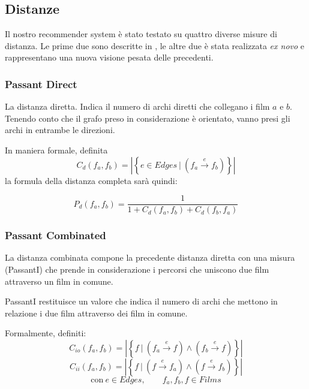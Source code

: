 \label{Measure}

\subsection{Distanze}

Il nostro recommender system è stato testato su quattro diverse misure di distanza.
Le prime due sono descritte in \citet{passant2010measuring}, le altre due è stata realizzata \emph{ex novo} e rappresentano una nuova visione pesata delle precedenti.


\subsubsection{Passant Direct}
\label{PassantD}
La distanza diretta. Indica il numero di archi diretti che collegano i film $a$ e $b$. Tenendo conto che il grafo preso in considerazione è orientato, vanno presi gli archi in entrambe le direzioni.

In maniera formale, definita $$C_{d}(f_a,f_b) = \left\vert \left\{ e \in Edges \  | \  (f_a \xrightarrow{~e~} f_b ) \right\} \right\vert$$ la formula della distanza completa sarà quindi:


    \begin{equation}
        P_{d}(f_{a},f_{b}) = \frac{1} {1+C_{d}(f_{a},f_{b})+C_{d}(f_{b},f_{a})}
    \end{equation}

\subsubsection{Passant Combinated}
\label{PassantC}

La distanza combinata compone la precedente distanza diretta con una misura
(PassantI) che prende in considerazione i percorsi che uniscono due film
attraverso un film in comune.

PassantI restituisce un valore che indica il numero di archi che
mettono in relazione i due film attraverso dei film in comune.

Formalmente, definiti:
$$C_{io}(f_a,f_b) = \left\vert \left\{ f \  | \  (f_a \xrightarrow{~e~} f ) \wedge (f_b \xrightarrow{~e~} f) \right\} \right\vert$$
$$C_{ii}(f_a,f_b) = \left\vert \left\{ f \  | \  ( f \xrightarrow{~e~} f_a ) \wedge ( f \xrightarrow{~e~} f_b) \right\} \right\vert$$
$$\text{con} \ e \in Edges  , \qquad f_a,f_b,f \in Films $$

